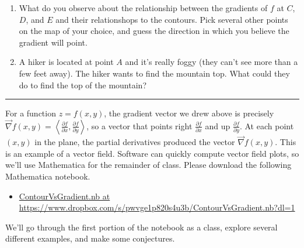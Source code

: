 \documentclass[letterpaper,oneside]{book}%
\begin{document}
\begin{enumerate}
\begin{enumerate}
  \item  Estimate $\dfrac{\Delta z}{\Delta x}$ at point $D$. 
  \item  Estimate $\dfrac{\Delta z}{\Delta y}$ at point $D$. 
  \item  Draw an arrow starting at $D$ that moves right $\dfrac{\Delta z}{\Delta x}$ units and up $\dfrac{\Delta z}{\Delta y}$ units, in other words draw the gradient of $f$ at $D$, written as $\vec \nabla f(D)$
  \item  Estimate $\dfrac{\Delta z}{\Delta x}$ at point $E$. 
  \item  Estimate $\dfrac{\Delta z}{\Delta y}$ at point $E$. 
  \item  Draw an arrow starting at $E$ that represents $\vec \nabla f(E)$.
 \end{enumerate}
 \item What do you observe about the relationship between the gradients of $f$ at $C$, $D$, and $E$ and their relationshops to the contours. Pick several other points on the map of your choice, and guess the direction in which you believe the gradient will point. 
 \item A hiker is located at point $A$ and it's really foggy (they can't see more than a few feet away).  The hiker wants to find the mountain top. What could they do to find the top of the mountain?
\end{enumerate}
\hrule
\vspace{.2in} 

For a function $z=f(x,y)$, the gradient vector we drew above is precisely 
$\vec \nabla f(x,y) = \left<\frac{\partial f}{\partial x},\frac{\partial f}{\partial y}\right>$, so a vector that points right $\frac{\partial f}{\partial x}$ and up $\frac{\partial f}{\partial y}$.   
At each point $(x,y)$ in the plane, the partial derivatives produced the vector $\vec \nabla f(x,y)$. 
This is an example of a vector field.  
Software can quickly compute vector field plots, so we'll use Mathematica for the remainder of class. 
Please download the following Mathematica notebook. 
\begin{itemize}
 \item \href{https://www.dropbox.com/s/pwvge1p820s4u3b/ContourVsGradient.nb?dl=1}{ContourVsGradient.nb at https://www.dropbox.com/s/pwvge1p820s4u3b/ContourVsGradient.nb?dl=1}
\end{itemize}
We'll go through the first portion of the notebook as a class, explore several different examples, and make some conjectures. 
\end{document}
